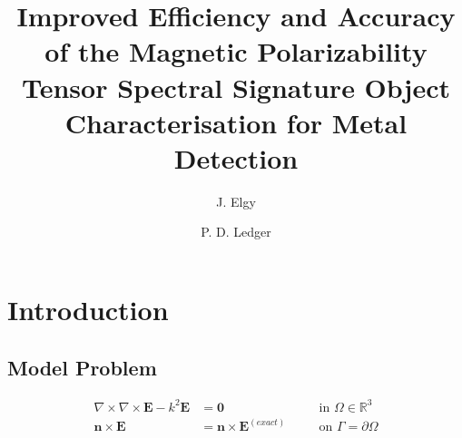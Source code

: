 \documentclass[a4paper,12]{elsarticle}
\theoremstyle{definition}
\newcommand{\curl}{\nabla \times}
\begin{document}

\begin{frontmatter}

\title{Improved Efficiency and Accuracy of the Magnetic Polarizability Tensor Spectral Signature Object Characterisation for Metal Detection}
%
\cortext[cor1]{*}
 
\author[1]{J. Elgy} 
\author[1]{P. D. Ledger} 


\begin{abstract}

\end{abstract}

\begin{keyword} 
\end{keyword}

\end{frontmatter}

\section{Introduction}\label{sect:intro}

\subsection{Model Problem}
\begin{equation}\label{eqn:system}
\begin{alignedat}{2}
\curl \curl \boldsymbol{E} - k^2\boldsymbol{E} &= \boldsymbol{0} &&\quad \text{in } \Omega \in \mathbb{R}^3 \\
\boldsymbol{n} \times \boldsymbol{E} &= \boldsymbol{n} \times \boldsymbol{E}^{(exact)} &&\quad \text{on } \Gamma = \partial \Omega
\end{alignedat}
\end{equation}
\end{document}
